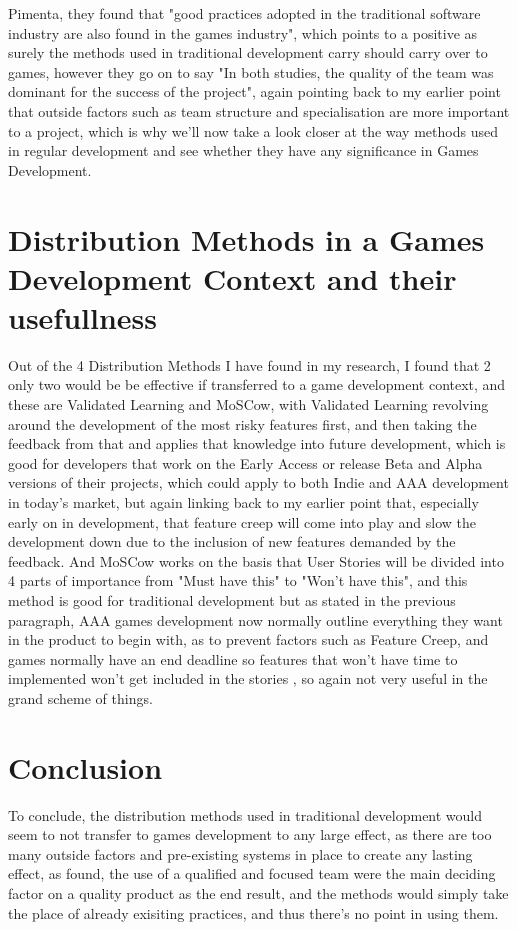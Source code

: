 \documentclass{scrartcl}
\begin{document}
Pimenta, they found that "good practices adopted in the traditional software industry are also found in the games industry"\cite{petrillo2010agility}, which points to a positive as surely the methods used in traditional development carry should carry over to games, however they go on to say "In both studies, the quality of the team was dominant for the success of the project"\cite{petrillo2010agility}, again pointing back to my earlier point that outside factors such as team structure and specialisation are more important to a project,  which is why we'll now take a look closer at the way methods used in regular development and see whether they have any significance in Games Development.

\section{Distribution Methods in a Games Development Context and their usefullness}
Out of the 4 Distribution Methods I have found in my research, I found that 2 only two would be be effective if transferred to a game development context, and these are Validated Learning and MoSCow\cite{popli2014prioritising}, with Validated Learning revolving around the development of the most risky features first, and then taking the feedback from that and applies that knowledge into future development, which is good for developers that work on the Early Access or release Beta and Alpha versions of their projects, which could apply to both Indie and AAA development in today's market, but again linking back to my earlier point that, especially early on in development, that feature creep will come into play and slow the development down due to the inclusion of new features demanded by the feedback. And MoSCow works on the basis that User Stories will be divided into 4 parts of importance from "Must have this" to "Won't have this"\cite{popli2014prioritising}, and this method is good for traditional development but as stated in the previous paragraph, AAA games development now normally outline everything they want in the product to begin with, as to prevent factors such as Feature Creep, and games normally have an end deadline so features that won't have time to implemented won't get included in the stories , so again not very useful in the grand scheme of things. 


\section{Conclusion}
To conclude, the distribution methods used in traditional development would seem to not transfer to games development to any large effect, as there are too many outside factors and pre-existing systems in place to create any lasting effect, as found, the use of a qualified and focused team were the main deciding factor on a quality product as the end result, and the methods would simply take the place of already exisiting practices, and thus there's no point in using them.  
\end{document}
